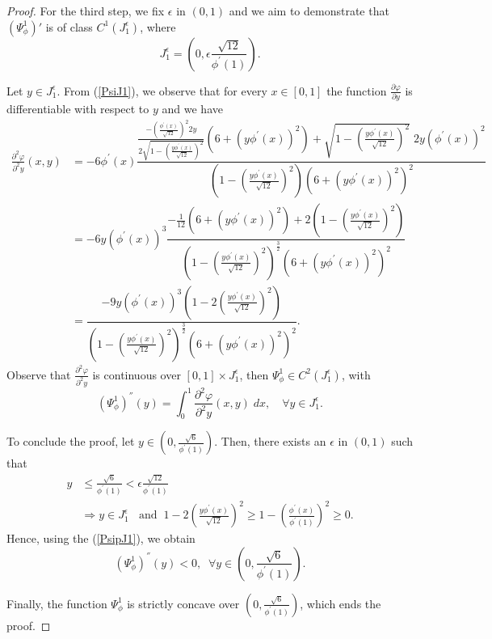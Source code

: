 \documentclass[11pt]{article}
\begin{document}
\begin{proof}
For the third step, we fix $\epsilon$  in $(0,1)$ and we aim to demonstrate  that $\left(\Psi_{\phi}^{1}\right)'$ is of class $C^{1}\left(J_1^{\epsilon}\right)$, where $$J_1^{\epsilon}=\left(0,\epsilon\frac{\sqrt{12}}{\phi^{'}(1)}  \right).$$

Let $y\in J_1^{\epsilon}$. From (\ref{PsiJ1}), we observe that for every $x\in [0,1]$ the function $\frac{\partial\varphi}{\partial y}$ is differentiable with respect to $y$ and we have 
\begin{align*}
    \frac{\partial^2\varphi}{\partial^2 y}(x,y)&=-6\phi^{'}(x)\dfrac{\frac{-\left(\frac{\phi^{'}(x)}{\sqrt{12}}\right)^2 2y}{2\sqrt{1-\left(\frac{y\phi^{'}(x)}{\sqrt{12}}\right)^2}}\left(6+\left(y\phi^{'}(x)\right)^2\right)+\sqrt{1-\left(\frac{y\phi^{'}(x)}{\sqrt{12}}\right)^2}\;2y\left(\phi^{'}(x)\right)^2}{\left(1-\left(\frac{y\phi^{'}(x)}{\sqrt{12}}\right)^2\right)\left(6+\left(y\phi^{'}(x)\right)^2\right)^2}\\
    &=-6y\left(\phi^{'}(x)\right)^3\dfrac{-\frac{1}{12}\left(6+\left(y\phi^{'}(x)\right)^2\right)+2\left(1-\left(\frac{y\phi^{'}(x)}{\sqrt{12}}\right)^2\right)}{\left(1-\left(\frac{y\phi^{'}(x)}{\sqrt{12}}\right)^2\right)^{\frac{3}{2}}\left(6+\left(y\phi^{'}(x)\right)^2\right)^2}\\
    &=\dfrac{-9y\left(\phi^{'}(x)\right)^3 \left(1-2\left(\frac{y\phi^{'}(x)}{\sqrt{12}}\right)^2\right)}{\left(1-\left(\frac{y\phi^{'}(x)}{\sqrt{12}}\right)^2\right)^{\frac{3}{2}}\left(6+\left(y\phi^{'}(x)\right)^2\right)^2}.
\end{align*}
Observe that $\frac{\partial^2\varphi}{\partial^2 y}$ is continuous over $[0,1]\times J_1^{\epsilon} $, then  $\Psi_{\phi}^{1}\in C^2(J_1^{\epsilon})$, with
\begin{equation}\label{PsipJ1}
\left(\Psi_{\phi}^{1}\right)^{''}(y)=\displaystyle\int_0^1 \dfrac{\partial^2 \varphi}{\partial^2 y}(x,y)\;dx,\quad\forall y\in J_1^{\epsilon}.
\end{equation}

To conclude the proof, let $y\in \left(0,\frac{\sqrt{6}}{\phi^{'}(1)}\right)$. Then, there exists an $\epsilon$ in $(0,1)$ such that 
\begin{align*}
    y&\leq \frac{\sqrt{6}}{\phi^{'}(1)}< \epsilon\frac{\sqrt{12}}{\phi^{'}(1)}\\
    &\Rightarrow y\in J_1^{\epsilon}\;\;\text{ and}\;\; 1-2\left(\frac{y\phi^{'}(x)}{\sqrt{12}}\right)^2\geq 1-\left(\frac{\phi^{'}(x)}{\phi^{'}(1)}\right)^2\geq 0.
\end{align*}
Hence, using the (\ref{PsipJ1}), we obtain 
$$\left(\Psi_{\phi}^{1}\right)^{''}(y)<0,\;\;\forall y\in \left(0,\frac{\sqrt{6}}{\phi^{'}(1)}\right). $$

Finally, the function $\Psi_{\phi}^{1}$ is strictly concave over $\left(0,\frac{\sqrt{6}}{\phi^{'}(1)}\right)$, which ends the proof.
\end{proof}
\end{document}
